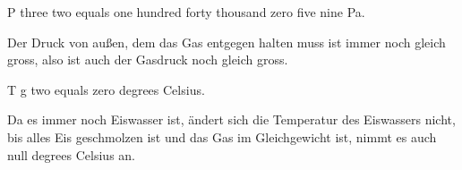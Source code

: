 P three two equals one hundred forty thousand zero five nine Pa.

Der Druck von außen, dem das Gas entgegen halten muss ist immer noch gleich gross, also ist auch der Gasdruck noch gleich gross.

T g two equals zero degrees Celsius.

Da es immer noch Eiswasser ist, ändert sich die Temperatur des Eiswassers nicht, bis alles Eis geschmolzen ist und das Gas im Gleichgewicht ist, nimmt es auch null degrees Celsius an.